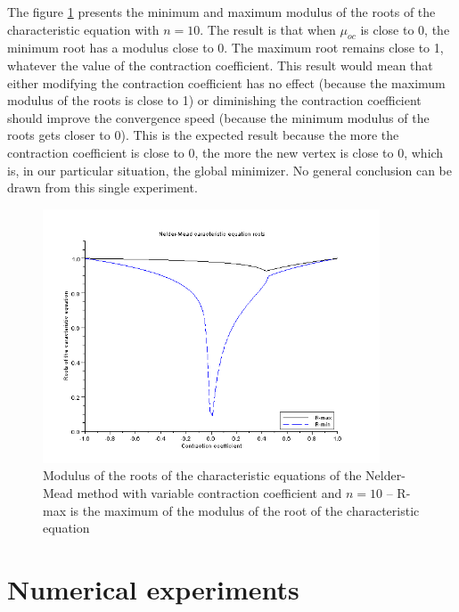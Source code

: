 The figure \ref{fig-nm-roots-variable} presents the minimum
and maximum modulus of the roots of the characteristic equation
with $n=10$. The result is that when $\mu_{oc}$ is close to 0, the 
minimum root has a modulus close to 0. The maximum root remains close to 
1, whatever the value of the contraction coefficient.
This result would mean that either modifying the contraction
coefficient has no effect (because the maximum modulus of the roots 
is close to 1) or diminishing the contraction coefficient should 
improve the convergence speed (because the minimum modulus of the 
roots gets closer to 0). This is the expected result because
the more the contraction coefficient is close to 0, the more the new 
vertex is close to 0, which is, in our particular situation, the 
global minimizer. No general conclusion can be drawn from this single 
experiment.

\begin{figure}
\begin{center}
\includegraphics[width=10cm]{neldermeadmethod/neldermead-roots-variable.png}
\end{center}
\caption{Modulus of the roots of the characteristic equations of the Nelder-Mead method with variable 
contraction coefficient and $n=10$ -- R-max is the maximum of the modulus of the root of the 
characteristic equation}
\label{fig-nm-roots-variable}
\end{figure}

\section{Numerical experiments}

